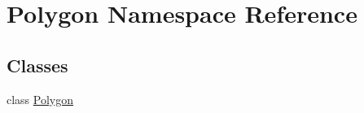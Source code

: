 \hypertarget{namespace_polygon}{}\section{Polygon Namespace Reference}
\label{namespace_polygon}
\subsection*{Classes}
\begin{DoxyCompactItemize}
\item 
class \hyperlink{class_polygon_1_1_polygon}{Polygon}
\end{DoxyCompactItemize}
